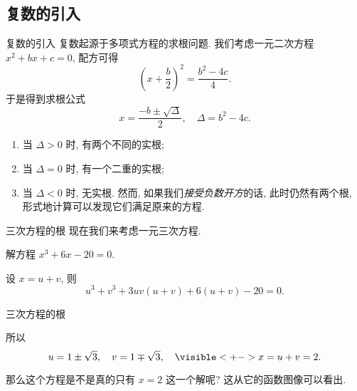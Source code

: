 \subsection{复数的引入}

\begin{frame}{复数的引入}
\onslide<+->复数起源于多项式方程的求根问题.
\onslide<+->我们考虑一元二次方程 $x^2+bx+c=0$,
\onslide<+->配方可得
	\[\left(x+\frac b2\right)^2=\frac{b^2-4c}4.\]
\onslide<+->于是得到求根公式
	\[x=\frac{-b\pm\sqrt\Delta}2,\quad \Delta=b^2-4c.\]
	\vspace{-\baselineskip}
\begin{enumerate}
\item 当 $\Delta>0$ 时, 有两个不同的实根;
\item 当 $\Delta=0$ 时, 有一个二重的实根;
\item 当 $\Delta<0$ 时, 无实根.
\onslide<+->然而, 如果我们\emph{接受负数开方}的话, 此时仍然有两个根, 形式地计算可以发现它们满足原来的方程.
\end{enumerate}
\end{frame}

\begin{frame}{三次方程的根}
\onslide<+->现在我们来考虑一元三次方程.
\onslide<+->
\begin{example}
解方程 $x^3+6x-20=0$.
\end{example}
\onslide<+->
\begin{solution}
设 $x=u+v$, 则
	\[u^3+v^3+3uv(u+v)+6(u+v)-20=0.\]
\visible<+->{我们希望
	\[u^3+v^3=20,\quad uv=-2,\]}%
\visible<+->{解得
	\[u^3=10\pm\sqrt{108}\visible<+->{=(1\pm\sqrt3)^3.}\]}
\vspace{-1.2\baselineskip}
\end{solution}
\end{frame}


\begin{frame}{三次方程的根}
\onslide<+->
\begin{solutionc}
所以
\[u=1\pm\sqrt3,\quad v=1\mp\sqrt 3,\quad	\visible<+->{x=u+v=2.}\]
\vspace{-\baselineskip}
\end{solutionc}
\onslide<+->
那么这个方程是不是真的只有 $x=2$ 这一个解呢?
\onslide<+->
这从它的函数图像可以看出.
\begin{center}
\end{center}
\end{frame}


